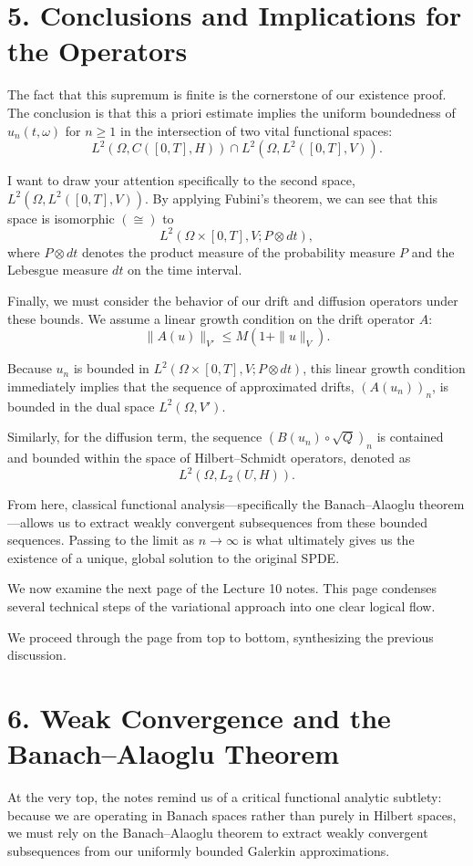 \documentclass[11pt]{article}
\theoremstyle{definition}
\theoremstyle{remark}
\begin{document}
\section*{5. Conclusions and Implications for the Operators}
The fact that this supremum is finite is the cornerstone of our existence proof. The conclusion is that this a priori estimate implies the uniform boundedness of $u_n(t,\omega)$ for $n \ge 1$ in the intersection of two vital functional spaces:
\[
  L^2(\Omega, C([0,T],H)) \cap L^2(\Omega, L^2([0,T],V)).
\]

I want to draw your attention specifically to the second space, $L^2(\Omega, L^2([0,T],V))$. By applying Fubini's theorem, we can see that this space is isomorphic $(\cong)$ to
\[
  L^2(\Omega \times [0,T], V; P \otimes dt),
\]
where $P \otimes dt$ denotes the product measure of the probability measure $P$ and the Lebesgue measure $dt$ on the time interval.

Finally, we must consider the behavior of our drift and diffusion operators under these bounds. We assume a linear growth condition on the drift operator $A$:
\[
  \|A(u)\|_{V'} \le M(1 + \|u\|_V).
\]

Because $u_n$ is bounded in $L^2(\Omega \times [0,T], V; P \otimes dt)$, this linear growth condition immediately implies that the sequence of approximated drifts, $(A(u_n))_n$, is bounded in the dual space $L^2(\Omega, V')$.

Similarly, for the diffusion term, the sequence $(B(u_n) \circ \sqrt{Q})_n$ is contained and bounded within the space of Hilbert--Schmidt operators, denoted as
\[
  L^2(\Omega, L_2(U,H)).
\]

From here, classical functional analysis---specifically the Banach--Alaoglu theorem---allows us to extract weakly convergent subsequences from these bounded sequences. Passing to the limit as $n \to \infty$ is what ultimately gives us the existence of a unique, global solution to the original SPDE.


We now examine the next page of the Lecture 10 notes. This page condenses several technical steps of the variational approach into one clear logical flow.

We proceed through the page from top to bottom, synthesizing the previous discussion.

\section*{6. Weak Convergence and the Banach--Alaoglu Theorem}
At the very top, the notes remind us of a critical functional analytic subtlety: because we are operating in Banach spaces rather than purely in Hilbert spaces, we must rely on the Banach--Alaoglu theorem to extract weakly convergent subsequences from our uniformly bounded Galerkin approximations.
\end{document}
